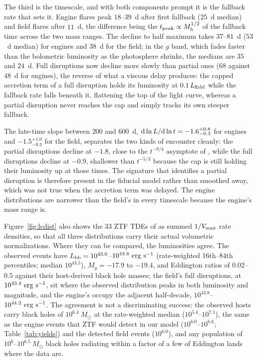 \documentclass[twocolumn,pdftex]{aastex701}
\newcommand{\msun}{M_{\odot}\xspace}
\begin{document}
The third is the timescale, and with both components prompt it is the fallback rate that sets it. Engine flares peak $18$--$39$~d after first fallback ($25$~d median) and field flares after $11$~d, the difference being the $t_{\rm peak} \propto M_{\rm h}^{1/2}$ of the fallback time across the two mass ranges. The decline to half maximum takes $37$--$81$~d ($53$~d median) for engines and $38$~d for the field; in the $g$ band, which fades faster than the bolometric luminosity as the photosphere shrinks, the medians are $35$ and $24$~d. Full disruptions now decline more slowly than partial ones ($68$ against $48$~d for engines), the reverse of what a viscous delay produces: the capped accretion term of a full disruption holds its luminosity at $0.1\, L_{\rm Edd}$ while the fallback rate falls beneath it, flattening the top of the light curve, whereas a partial disruption never reaches the cap and simply tracks its own steeper fallback.

The late-time slope between $200$ and $600$~d, ${\rm d}\ln L/{\rm d}\ln t = -1.6^{+0.8}_{-0.3}$ for engines and $-1.5^{+1.0}_{-0.3}$ for the field, separates the two kinds of encounter cleanly: the partial disruptions decline at $-1.8$, close to the $t^{-9/4}$ asymptote of \citet{Coughlin:2019a}, while the full disruptions decline at $-0.9$, shallower than $t^{-5/3}$ because the cap is still holding their luminosity up at those times. The signature that identifies a partial disruption is therefore present in the fiducial model rather than smoothed away, which was not true when the accretion term was delayed. The engine distributions are narrower than the field's in every timescale because the engine's mass range is.

Figure~\ref{fig:lcdist} also shows the $33$ ZTF TDEs of \citet{Yao:2023a} as summed $1/V_{\rm max}$ rate densities, so that all three distributions carry their actual volumetric normalizations. Where they can be compared, the luminosities agree. The observed events have $L_{\rm bb} = 10^{43.0}$--$10^{43.8}~{\rm erg~s^{-1}}$ (rate-weighted 16th--84th percentiles; median $10^{43.5}$), $M_g = -17.9$ to $-19.4$, and Eddington ratios of $0.02$--$0.5$ against their host-derived black hole masses; the field's full disruptions, at $10^{43.4}~{\rm erg~s^{-1}}$, sit where the observed distribution peaks in both luminosity and magnitude, and the engine's occupy the adjacent half-decade, $10^{43.8}$--$10^{44.2}~{\rm erg~s^{-1}}$. The agreement is not a discriminating success: the observed hosts carry black holes of $10^{6.4}~\msun$ at the rate-weighted median ($10^{5.4}$--$10^{7.1}$), the same as the engine events that ZTF would detect in our model ($10^{6.0}$--$10^{6.6}$; Table~\ref{tab:yields}) and the detected field events ($10^{6.0}$), and any population of $10^{6}$--$10^{6.5}~\msun$ black holes radiating within a factor of a few of Eddington lands where the data are.
\end{document}
